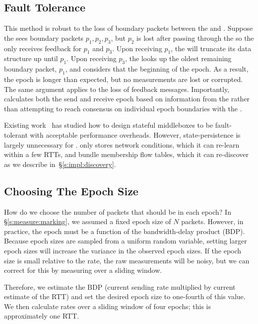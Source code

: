 \subsection{Fault Tolerance}
\label{s:measure:loss}
 This method is robust to the loss of boundary packets between the \inbox and \outbox.
Suppose the \inbox sees boundary packets $p_1, p_2, p_3$, but $p_2$ is lost after passing through
the \inbox so the \inbox only receives feedback for $p_1$ and $p_3$. Upon receiving $p_1$, 
the \inbox will truncate its data structure up until $p_1$. Upon receiving $p_3$, the \inbox 
looks up the oldest remaining boundary packet, $p_1$, and considers that the beginning of the epoch.
As a result, the epoch is longer than expected, but no measurements are lost or corrupted. 
The same argument applies to the loss of feedback messages. 
Importantly, \inbox calculates both the send and receive epoch based on information
from the \outbox rather than attempting to reach consensus on individual epoch boundaries with the \outbox. 

 Existing work~\cite{ftmb} has studied how to design stateful middleboxes to be fault-tolerant with acceptable performance overheads. 
However, state-persistence is largely unnecessary for \name.
\name only stores network conditions, which it can re-learn within a few RTTs, and bundle membership flow tables, which it can re-discover as we describe in~\S\ref{s:impl:discovery}. 

\subsection{Choosing The Epoch Size}
\label{s:measure:epoch}


How do we choose the number of packets that should be in each epoch?
In \S\ref{s:measure:marking}, we assumed a fixed epoch size of $N$ packets.
However, in practice, the epoch must be a function of the bandwidth-delay product (BDP).
Because epoch sizes are sampled from a uniform random variable, setting larger epoch sizes will increase the variance in the observed epoch sizes.
If the epoch size is small relative to the rate, the raw measurements will be noisy, but we can correct for this by measuring over a sliding window.

Therefore, we estimate the BDP (current sending rate multiplied by current estimate of the RTT) and set the desired epoch size to one-fourth of this value. We then calculate rates over a sliding window of four epochs; this is approximately one RTT.

